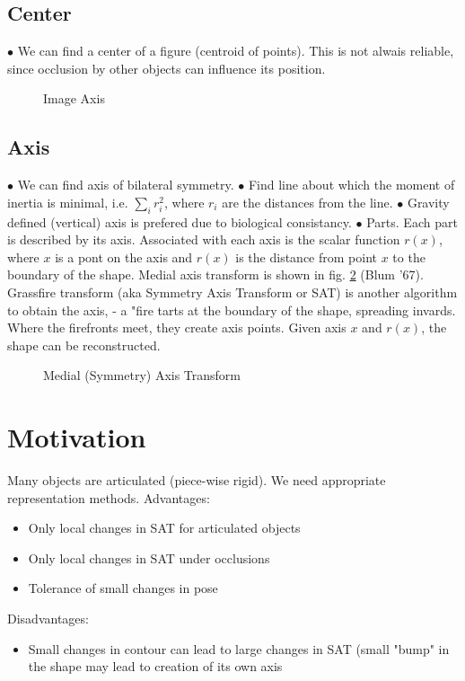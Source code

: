 \subsection{Center}
$\bullet$ We can find a center of a figure (centroid of points). This is not alwais reliable, since occlusion by other objects can influence its position.

\begin{figure}[t]
\epsfxsize=3.000in
\caption{Image Axis}
\label{axis}
\end{figure}

\subsection{Axis}
$\bullet$ We can find axis of bilateral symmetry.\newline
$\bullet$ Find line about which the moment of inertia is minimal, i.e. $\sum_{i} r_{i}^{2}$, where $r_{i}$ are the distances from the line.\newline
$\bullet$ Gravity defined (vertical) axis is prefered due to biological consistancy.\newline
$\bullet$ Parts. Each part is described by its axis. Associated with each axis is the scalar function $r(x)$, where $x$ is a pont on the axis and $r(x)$ is the distance from point $x$ to the boundary of the shape. Medial axis transform is shown in fig. \ref{MAT} (Blum '67).\newline
Grassfire transform (aka Symmetry Axis Transform or SAT) is another algorithm to obtain the axis, - a "fire tarts at the boundary of the shape, spreading invards. Where the firefronts meet, they create axis points.
Given axis $x$ and $r(x)$, the shape can be reconstructed.

\begin{figure}[t]
\epsfxsize=3.000in
\caption{Medial (Symmetry) Axis Transform}
\label{MAT}
\end{figure}

\section{Motivation}
Many objects are articulated (piece-wise rigid). We need appropriate representation methods.\newline
Advantages:
\begin{itemize} 
  \item Only local changes in SAT for articulated objects
  \item Only local changes in SAT under occlusions
  \item Tolerance of small changes in pose
\end{itemize}
Disadvantages:
\begin{itemize} 
  \item Small changes in contour can lead to large changes in SAT (small "bump" in the shape may lead to creation of its own axis
\end{itemize}



